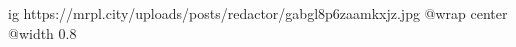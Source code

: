  
 
 
 
 

\ifcmt
  ig https://mrpl.city/uploads/posts/redactor/gabgl8p6zaamkxjz.jpg
  @wrap center
  @width 0.8
\fi
